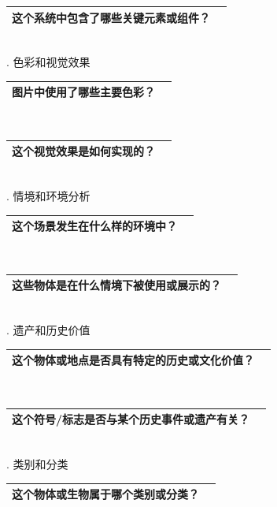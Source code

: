 \documentclass[12pt]{book}
\begin{document}
\begin{tabular}{|p{15cm}|p{3cm}|}
	\hline
这个系统中包含了哪些关键元素或组件？\\
	\hline
\end{tabular}\\


. 色彩和视觉效果

\begin{tabular}{|p{15cm}|p{3cm}|}
	\hline
图片中使用了哪些主要色彩？\\
	\hline
\end{tabular}\\


\begin{tabular}{|p{15cm}|p{3cm}|}
	\hline
这个视觉效果是如何实现的？\\
	\hline
\end{tabular}\\

. 情境和环境分析

\begin{tabular}{|p{15cm}|p{3cm}|}
	\hline
这个场景发生在什么样的环境中？\\
	\hline
\end{tabular}\\



\begin{tabular}{|p{15cm}|p{3cm}|}
	\hline
这些物体是在什么情境下被使用或展示的？\\
	\hline
\end{tabular}\\



. 遗产和历史价值

\begin{tabular}{|p{15cm}|p{3cm}|}
	\hline
这个物体或地点是否具有特定的历史或文化价值？\\
	\hline
\end{tabular}\\


\begin{tabular}{|p{15cm}|p{3cm}|}
	\hline
这个符号/标志是否与某个历史事件或遗产有关？\\
	\hline
\end{tabular}\\


. 类别和分类

\begin{tabular}{|p{15cm}|p{3cm}|}
	\hline
这个物体或生物属于哪个类别或分类？\\
	\hline
\end{tabular}\\
\end{document}
